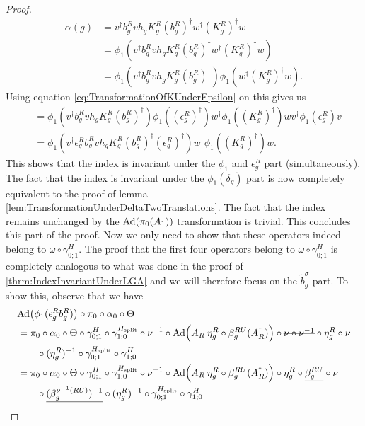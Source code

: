 \documentclass[12pt,a4paper,twoside]{article}
\newcommand{\stkout}[1]{\ifmmode\text{\sout{\ensuremath{#1}}}\else\sout{#1}\fi}
\let\originalleft\left
\let\originalright\right
\renewcommand{\left}{\mathopen{}\mathclose\bgroup\originalleft}
\renewcommand{\right}{\aftergroup\egroup\originalright}
\newcommand{\Ad}[1]{\textrm{Ad}\left(#1\right)}
\theoremstyle{definition}
\numberwithin{equation}{section}
\begin{document}
\begin{proof}
\begin{align}
\alpha(g)&=v^\dagger b_g^R v h_g K_g^R (b_g^R)^\dagger w^\dagger (K_g^R)^\dagger w\\
&=\phi_1(v^\dagger b_g^R v h_g K_g^R (b_g^R)^\dagger w^\dagger (K_g^R)^\dagger w)\\
&=\phi_1(v^\dagger b_g^R v h_g K_g^R (b_g^R)^\dagger)\phi_1( w^\dagger (K_g^R)^\dagger w).
\end{align}
Using equation \eqref{eq:TransformationOfKUnderEpsilon} on this gives us
\begin{align}
&=\phi_1(v^\dagger b_g^R v h_g K_g^R (b_g^R)^\dagger)\phi_1((\epsilon_g^R)^\dagger)w^\dagger\phi_1(  (K_g^R)^\dagger )wv^\dagger \phi_1(\epsilon_g^R)v\\
&=\phi_1(v^\dagger \epsilon_g^R b_g^R v h_g K_g^R (b_g^R)^\dagger (\epsilon_g^R)^\dagger)w^\dagger\phi_1(  (K_g^R)^\dagger )w.
\end{align}
This shows that the index is invariant under the $\phi_1$ and $\epsilon^R_g$ part (simultaneously). The fact that the index is invariant under the $\phi_1(\delta_g)$ part is now completely equivalent to the proof of lemma \ref{lem:TransformationUnderDeltaTwoTranslations}. The fact that the index remains unchanged by the $\Ad{\pi_0(A_1)}$ transformation is trivial. This concludes this part of the proof. Now we only need to show that these operators indeed belong to $\omega\circ\gamma^H_{0;1}$. The proof that the first four operators belong to $\omega\circ\gamma^H_{0;1}$ is completely analogous to what was done in the proof of \ref{thrm:IndexInvariantUnderLGA} and we will therefore focus on the $\tilde{b}_g^\sigma$ part. To show this, observe that we have
	\begin{align}
		&\Ad{\phi_1(\epsilon_g^R b_g^R)}\circ\pi_0\circ\alpha_0\circ\Theta\\
		&=\pi_0\circ\alpha_0\circ\Theta\circ\gamma^H_{0;1}\circ\gamma^{H_{\text{split}}}_{1;0}\circ\nu^{-1}\circ\Ad{A_R\: \eta_g^R\circ\beta_g^{RU}(A_R^\dagger)}\circ\stkout{\nu\circ\nu^{-1}}\circ\eta_g^R\circ\nu\\
		\nonumber
		&\qquad\circ(\eta_g^R)^{-1}\circ\gamma^{H_{\text{split}}}_{0;1}\circ\gamma^{H}_{1;0}\\
		&=\pi_0\circ\alpha_0\circ\Theta\circ\gamma^H_{0;1}\circ\gamma^{H_{\text{split}}}_{1;0}\circ\nu^{-1}\circ\Ad{A_R\: \eta_g^R\circ\beta_g^{RU}(A_R^\dagger)}\circ\eta_g^R\circ\underline{\beta_g^{RU}}\circ\nu\\
		\nonumber
		&\qquad\circ\underline{(\beta_g^{\nu^{-1}(RU)})^{-1}}\circ(\eta_g^R)^{-1}\circ\gamma^{H_{\text{split}}}_{0;1}\circ\gamma^{H}_{1;0}\\

\end{align}
\end{proof}
\end{document}
